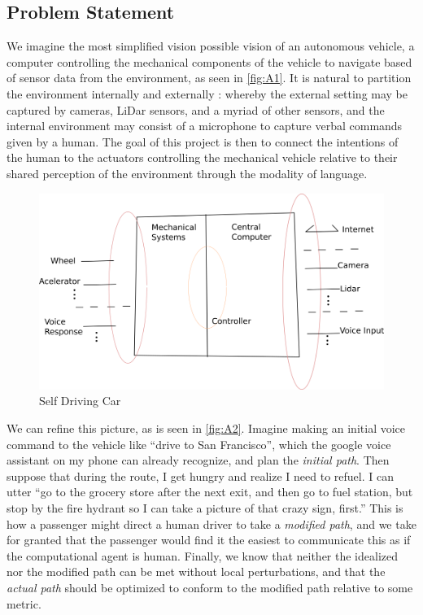 \documentclass[a4paper, 11pt]{article}
\begin{document}
\subsection{Problem Statement}

We imagine the most simplified vision possible vision of an autonomous
vehicle, a computer controlling the mechanical components of the vehicle to
navigate based of sensor data from the environment, as seen in \autoref{fig:A1}.
It is natural to partition the environment internally and externally : whereby
the external setting may be captured by cameras, LiDar sensors, and a myriad of other
sensors, and the internal environment may consist of a microphone to capture
verbal commands given by a human. The goal of this project is then to connect
the intentions of the human to the actuators controlling the
mechanical vehicle relative to their shared perception of the environment
through the modality of language.

\begin{figure}
\centering
\includegraphics[width=150mm]{pics/selfDriving.png}
\caption{Self Driving Car}\label{fig:A1}
\end{figure}

We can refine this picture, as is seen in \autoref{fig:A2}. Imagine making an
initial voice command to the vehicle like ``drive to San Francisco'', which the
google voice assistant on my phone can already recognize, and plan the
\emph{initial path}. Then suppose that during the route, I get hungry and
realize I need to refuel. I can utter ``go to the grocery store after the next
exit, and then go to fuel station, but stop by the fire hydrant so I can take a
picture of that crazy sign, first.'' This is how a passenger might direct a
human driver to take a \emph{modified path}, and we take for granted that the
passenger would find it the easiest to communicate this as if the computational
agent is human. Finally, we know that neither the idealized nor the modified
path can be met without local perturbations, and that the \emph{actual path}
should be optimized to conform to the modified path relative to some metric.
\end{document}
